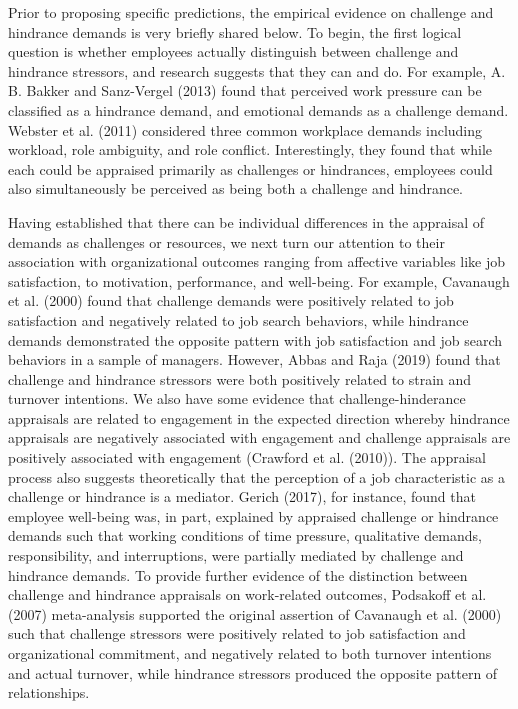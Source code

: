 \documentclass[
  man]{apa6}
\begin{document}
Prior to proposing specific predictions, the empirical evidence on challenge and hindrance demands is very briefly shared below. To begin, the first logical question is whether employees actually distinguish between challenge and hindrance stressors, and research suggests that they can and do. For example, A. B. Bakker and Sanz-Vergel (2013) found that perceived work pressure can be classified as a hindrance demand, and emotional demands as a challenge demand. Webster et al. (2011) considered three common workplace demands including workload, role ambiguity, and role conflict. Interestingly, they found that while each could be appraised primarily as challenges or hindrances, employees could also simultaneously be perceived as being both a challenge and hindrance.

Having established that there can be individual differences in the appraisal of demands as challenges or resources, we next turn our attention to their association with organizational outcomes ranging from affective variables like job satisfaction, to motivation, performance, and well-being. For example, Cavanaugh et al. (2000) found that challenge demands were positively related to job satisfaction and negatively related to job search behaviors, while hindrance demands demonstrated the opposite pattern with job satisfaction and job search behaviors in a sample of managers. However, Abbas and Raja (2019) found that challenge and hindrance stressors were both positively related to strain and turnover intentions. We also have some evidence that challenge-hinderance appraisals are related to engagement in the expected direction whereby hindrance appraisals are negatively associated with engagement and challenge appraisals are positively associated with engagement (Crawford et al. (2010)). The appraisal process also suggests theoretically that the perception of a job characteristic as a challenge or hindrance is a mediator. Gerich (2017), for instance, found that employee well-being was, in part, explained by appraised challenge or hindrance demands such that working conditions of time pressure, qualitative demands, responsibility, and interruptions, were partially mediated by challenge and hindrance demands. To provide further evidence of the distinction between challenge and hindrance appraisals on work-related outcomes, Podsakoff et al. (2007) meta-analysis supported the original assertion of Cavanaugh et al. (2000) such that challenge stressors were positively related to job satisfaction and organizational commitment, and negatively related to both turnover intentions and actual turnover, while hindrance stressors produced the opposite pattern of relationships.
\end{document}
